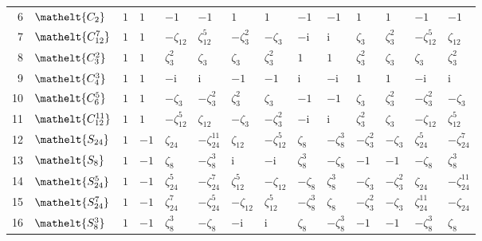 \documentclass[10pt,a4paper]{article}
\numberwithin{equation}{section}
\newcommand{\eltfont}[1]{{\let\sigma\eltsigma\mathelt{#1}}}
\newcommand{\cls}[1]{\eltfont{#1}}
\newcommand{\iunit}{\mathrm{i}}
\newcommand{\rootunity}[1]{\zeta_{#1}}
\begin{document}
{\begin{longtable}{@{}rlllllllllllll@{}}
6 & $\cls{C_{2}}$ & $1$ & $1$ & $-1$ & $-1$ & $1$ & $1$ & $-1$ & $-1$ & $1$ & $1$ & $-1$ & $-1$\\
7 & $\cls{C_{12}^{7}}$ & $1$ & $1$ & $-\rootunity{12}$ & $\rootunity{12}^{5}$ & $-\rootunity{3}^{2}$ & $-\rootunity{3}$ & $-\iunit{}$ & $\iunit{}$ & $\rootunity{3}$ & $\rootunity{3}^{2}$ & $-\rootunity{12}^{5}$ & $\rootunity{12}$\\
8 & $\cls{C_{3}^{2}}$ & $1$ & $1$ & $\rootunity{3}^{2}$ & $\rootunity{3}$ & $\rootunity{3}$ & $\rootunity{3}^{2}$ & $1$ & $1$ & $\rootunity{3}^{2}$ & $\rootunity{3}$ & $\rootunity{3}$ & $\rootunity{3}^{2}$\\
9 & $\cls{C_{4}^{3}}$ & $1$ & $1$ & $-\iunit{}$ & $\iunit{}$ & $-1$ & $-1$ & $\iunit{}$ & $-\iunit{}$ & $1$ & $1$ & $-\iunit{}$ & $\iunit{}$\\
10 & $\cls{C_{6}^{5}}$ & $1$ & $1$ & $-\rootunity{3}$ & $-\rootunity{3}^{2}$ & $\rootunity{3}^{2}$ & $\rootunity{3}$ & $-1$ & $-1$ & $\rootunity{3}$ & $\rootunity{3}^{2}$ & $-\rootunity{3}^{2}$ & $-\rootunity{3}$\\
11 & $\cls{C_{12}^{11}}$ & $1$ & $1$ & $-\rootunity{12}^{5}$ & $\rootunity{12}$ & $-\rootunity{3}$ & $-\rootunity{3}^{2}$ & $-\iunit{}$ & $\iunit{}$ & $\rootunity{3}^{2}$ & $\rootunity{3}$ & $-\rootunity{12}$ & $\rootunity{12}^{5}$\\
12 & $\cls{S_{24}}$ & $1$ & $-1$ & $\rootunity{24}$ & $-\rootunity{24}^{11}$ & $\rootunity{12}$ & $-\rootunity{12}^{5}$ & $\rootunity{8}$ & $-\rootunity{8}^{3}$ & $-\rootunity{3}^{2}$ & $-\rootunity{3}$ & $\rootunity{24}^{5}$ & $-\rootunity{24}^{7}$\\
13 & $\cls{S_{8}}$ & $1$ & $-1$ & $\rootunity{8}$ & $-\rootunity{8}^{3}$ & $\iunit{}$ & $-\iunit{}$ & $\rootunity{8}^{3}$ & $-\rootunity{8}$ & $-1$ & $-1$ & $-\rootunity{8}$ & $\rootunity{8}^{3}$\\
14 & $\cls{S_{24}^{5}}$ & $1$ & $-1$ & $\rootunity{24}^{5}$ & $-\rootunity{24}^{7}$ & $\rootunity{12}^{5}$ & $-\rootunity{12}$ & $-\rootunity{8}$ & $\rootunity{8}^{3}$ & $-\rootunity{3}$ & $-\rootunity{3}^{2}$ & $\rootunity{24}$ & $-\rootunity{24}^{11}$\\
15 & $\cls{S_{24}^{7}}$ & $1$ & $-1$ & $\rootunity{24}^{7}$ & $-\rootunity{24}^{5}$ & $-\rootunity{12}$ & $\rootunity{12}^{5}$ & $-\rootunity{8}^{3}$ & $\rootunity{8}$ & $-\rootunity{3}^{2}$ & $-\rootunity{3}$ & $\rootunity{24}^{11}$ & $-\rootunity{24}$\\
16 & $\cls{S_{8}^{3}}$ & $1$ & $-1$ & $\rootunity{8}^{3}$ & $-\rootunity{8}$ & $-\iunit{}$ & $\iunit{}$ & $\rootunity{8}$ & $-\rootunity{8}^{3}$ & $-1$ & $-1$ & $-\rootunity{8}^{3}$ & $\rootunity{8}$\\

\end{longtable}}
\end{document}
